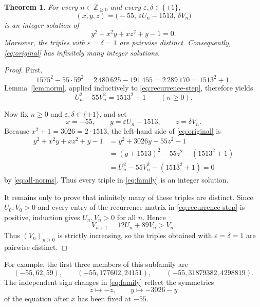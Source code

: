 \documentclass[11pt]{article}
\newtheorem{theorem}{Theorem}
\theoremstyle{remark}
\newcommand{\Z}{\mathbb Z}
\begin{document}
\begin{theorem}\label{thm:main}
For every $n\in\Z_{\geq0}$ and every $\varepsilon,\delta\in\{\pm1\}$,
\begin{equation}\label{eq:family}
 \boxed{
 (x,y,z)=\bigl(-55,\,\varepsilon U_n-1513,\,\delta V_n\bigr)
 }
\end{equation}
is an integer solution of
\begin{equation}\label{eq:original}
 y^2+x^2y+xz^2+y-1=0.
\end{equation}
Moreover, the triples with $\varepsilon=\delta=1$ are pairwise distinct.  Consequently, \eqref{eq:original} has infinitely many integer solutions.
\end{theorem}

\begin{proof}
First,
\begin{equation}\label{eq:seed-norm}
 1575^2-55\cdot59^2
 =2\,480\,625-191\,455
 =2\,289\,170
 =1513^2+1.
\end{equation}
Lemma~\ref{lem:norm}, applied inductively to \eqref{eq:recurrence-step}, therefore yields
\begin{equation}\label{eq:all-norms}
 U_n^2-55V_n^2=1513^2+1
 \qquad(n\geq0).
\end{equation}

Now fix $n\geq0$ and $\varepsilon,\delta\in\{\pm1\}$, and set
\[
 x=-55,
 \qquad
 y=\varepsilon U_n-1513,
 \qquad
 z=\delta V_n.
\]
Because $x^2+1=3026=2\cdot1513$, the left-hand side of \eqref{eq:original} is
\begin{align*}
 y^2+x^2y+xz^2+y-1
 &=y^2+3026y-55z^2-1\\
 &=(y+1513)^2-55z^2-(1513^2+1)\\
 &=U_n^2-55V_n^2-(1513^2+1)=0
\end{align*}
by \eqref{eq:all-norms}.  Thus every triple in \eqref{eq:family} is an integer solution.

It remains only to prove that infinitely many of these triples are distinct.  Since $U_0,V_0>0$ and every entry of the recurrence matrix in \eqref{eq:recurrence-step} is positive, induction gives $U_n,V_n>0$ for all $n$.  Hence
\[
 V_{n+1}=12U_n+89V_n>V_n.
\]
Thus $(V_n)_{n\geq0}$ is strictly increasing, so the triples obtained with $\varepsilon=\delta=1$ are pairwise distinct.
\end{proof}

For example, the first three members of this subfamily are
\[
 (-55,62,59),\qquad
 (-55,177602,24151),\qquad
 (-55,31879382,4298819).
\]
The independent sign changes in \eqref{eq:family} reflect the symmetries
\[
 z\longmapsto -z,
 \qquad
 y\longmapsto -3026-y
\]
of the equation after $x$ has been fixed at $-55$.
\end{document}
